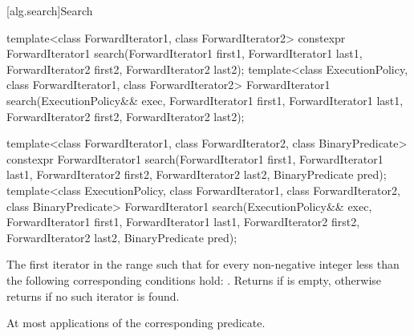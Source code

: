 [alg.search]{Search}

%
\begin{itemdecl}
template<class ForwardIterator1, class ForwardIterator2>
  constexpr ForwardIterator1
    search(ForwardIterator1 first1, ForwardIterator1 last1,
           ForwardIterator2 first2, ForwardIterator2 last2);
template<class ExecutionPolicy, class ForwardIterator1, class ForwardIterator2>
  ForwardIterator1
    search(ExecutionPolicy&& exec,
           ForwardIterator1 first1, ForwardIterator1 last1,
           ForwardIterator2 first2, ForwardIterator2 last2);

template<class ForwardIterator1, class ForwardIterator2,
         class BinaryPredicate>
  constexpr ForwardIterator1
    search(ForwardIterator1 first1, ForwardIterator1 last1,
           ForwardIterator2 first2, ForwardIterator2 last2,
           BinaryPredicate pred);
template<class ExecutionPolicy, class ForwardIterator1, class ForwardIterator2,
         class BinaryPredicate>
  ForwardIterator1
    search(ExecutionPolicy&& exec,
           ForwardIterator1 first1, ForwardIterator1 last1,
           ForwardIterator2 first2, ForwardIterator2 last2,
           BinaryPredicate pred);
\end{itemdecl}

\begin{itemdescr}
\pnum
\returns
The first iterator  in the range 
such that
for every non-negative integer  less than 
the following corresponding conditions hold:
.
Returns  if  is empty,
otherwise returns  if no such iterator is found.

\pnum
\complexity
At most  applications
of the corresponding predicate.
\end{itemdescr}

